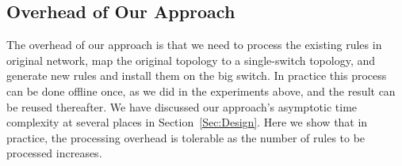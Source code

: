 \subsection{Overhead of Our Approach}
The overhead of our approach is that we need to process the existing rules in original network,
map the original topology to a single-switch topology, and
generate new rules and install them on the big switch.
In practice this process can be done offline once, as we did in the experiments above,
and the result can be reused thereafter.
We have discussed our approach's asymptotic time complexity at several places in Section~\ref{Sec:Design}.
Here we show that in practice,
the processing overhead is tolerable as the number of rules to be processed increases.
